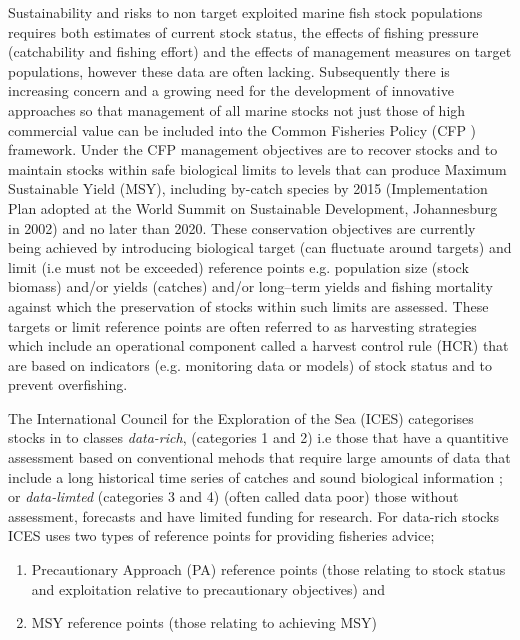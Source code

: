 \documentclass[preprint,12pt]{elsarticle}
\begin{document}
Sustainability and risks to non target exploited marine fish stock populations requires both estimates of current stock status, the effects of fishing pressure (catchability and fishing effort) and the effects of management measures on target populations, however these data are often lacking.  Subsequently there is increasing concern and a growing need for the development of innovative approaches so that management of all marine stocks not just those of high commercial value can be included into the Common Fisheries Policy (CFP \cite{european2013regulation}) framework. Under the CFP management objectives are to recover stocks and to maintain stocks within safe biological limits to levels that can produce Maximum Sustainable Yield (MSY), including by-catch species by 2015 (Implementation Plan adopted at the World Summit on Sustainable Development, Johannesburg in 2002) and no later than 2020. These conservation objectives are currently being achieved by introducing biological target (can fluctuate around targets) and limit (i.e must not be exceeded) reference points e.g. population size (stock biomass) and/or yields (catches) and/or long–term yields and fishing mortality against which the preservation of stocks within such limits are assessed. These targets or limit reference points are often referred to as harvesting strategies which include an operational component called a harvest control rule (HCR) that are based on indicators (e.g. monitoring data or models) of stock status and to prevent overfishing. 

The International Council for the Exploration of the Sea (ICES) categorises stocks in to classes \emph{data-rich}, (categories 1 and 2) i.e those that have a quantitive assessment based on conventional mehods that require large amounts of data that include a long historical time series of catches and sound biological information \cite{bentley2015data}; or \emph{data-limted} \cite{costello2012status}(categories 3 and 4) (often called data poor) those without assessment, forecasts and have limited funding for research. For data-rich stocks ICES uses two types of reference points for providing fisheries advice; 

\begin{enumerate}
  \item Precautionary Approach (PA) reference points (those relating to stock status and exploitation relative to precautionary objectives) and 
  \item MSY reference points (those relating to achieving MSY) 
\end{enumerate}
\end{document}
